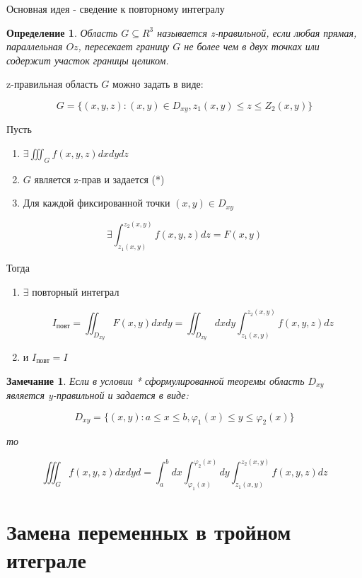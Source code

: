 \documentclass[a4paper, 14pt]{report}
\newtheorem{defenition}{Определение}[section]
\newtheorem{note}{Замечание}[section]
\begin{document}
Основная идея - сведение к повторному интегралу

\begin{defenition}
    Область $G \subseteq R^3$ называется z-правильной, если любая прямая, параллельная $Oz$, пересекает границу $G$ не более чем в двух точках или содержит участок границы целиком.
\end{defenition}

z-правильная область $G$ можно задать в виде:

$$
G = \{ (x,y,z) : (x,y) \in D_{xy}, z_1(x,y) \le z \le Z_2(x,y) \}
$$

\begin{theorem}
    Пусть

    \begin{enumerate}
        \item $\exists \iiint_G f(x,y,z) dxdydz$
        \item $G$ является z-прав и задается (*)
        \item Для каждой фиксированной точки $(x,y) \in D_{xy}$
    \end{enumerate}

    $$
    \exists \int_{z_1(x,y)}^{z_2(x,y)} f(x,y,z) dz = F(x,y)
    $$

    Тогда 

    \begin{enumerate}
        \item $\exists$ повторный интеграл

            $$
            I_\text{повт} = \iint_{D_{xy}} F(x,y) dxdy = \iint_{D_{xy}} dxdy \int_{z_1(x,y)}^{z_2(x,y)} f(x,y,z) dz
            $$

        \item и $I_\text{повт} = I$
    \end{enumerate}
\end{theorem}

\begin{note}
    Если в условии * сформулированной теоремы область $D_{xy}$ является y-правильной и задается в виде:

    $$
    D_{xy} = \{ (x,y): a \le x \le b, \varphi_1(x) \le y \le \varphi_2(x) \}
    $$

    то

    $$
    \iiint_G f(x,y,z) dxdyd = \int_a^bdx \int_{\varphi_1(x)}^{\varphi_2(x)} dy \int_{z_1(x,y)}^{z_2(x,y)} f(x,y,z) dz
    $$
\end{note}

\section{Замена переменных в тройном итеграле}
\end{document}
